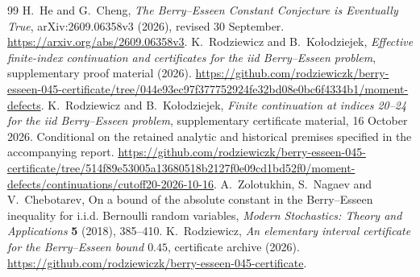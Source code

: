 \documentclass[11pt,a4paper]{article}
\numberwithin{equation}{section}
\theoremstyle{definition}
\theoremstyle{remark}
\begin{document}
\begin{thebibliography}{99}
H.~He and G.~Cheng, \emph{The Berry--Esseen Constant Conjecture is
Eventually True}, arXiv:2609.06358v3 (2026), revised 30 September.
\url{https://arxiv.org/abs/2609.06358v3}.
K.~Rodziewicz and B.~Ko{\l}odziejek, \emph{Effective finite-index
continuation and certificates for the iid Berry--Esseen problem},
supplementary proof material (2026).
\url{https://github.com/rodziewiczk/berry-esseen-045-certificate/tree/044e93ec97f377752924fe32bd08e0bc6f4334b1/moment-defects}.
K.~Rodziewicz and B.~Ko{\l}odziejek, \emph{Finite continuation at
indices 20--24 for the iid Berry--Esseen problem}, supplementary
certificate material, 16 October 2026. Conditional on the retained
analytic and historical premises specified in the accompanying report.
\url{https://github.com/rodziewiczk/berry-esseen-045-certificate/tree/514f89e53005a13680518b2127f0e09cd1bd52f0/moment-defects/continuations/cutoff20-2026-10-16}.
A.~Zolotukhin, S.~Nagaev and V.~Chebotarev, On a bound of the
absolute constant in the Berry--Esseen inequality for i.i.d.
Bernoulli random variables, \emph{Modern Stochastics: Theory and
Applications} \textbf{5} (2018), 385--410.
K.~Rodziewicz, \emph{An elementary interval certificate for the
Berry--Esseen bound \(0.45\)}, certificate archive (2026).
\url{https://github.com/rodziewiczk/berry-esseen-045-certificate}.
\end{thebibliography}
\end{document}
